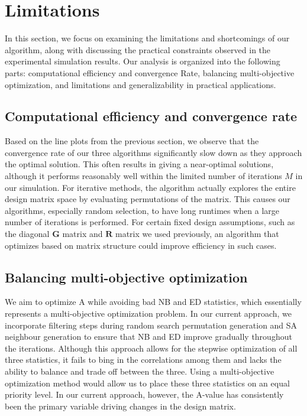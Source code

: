 \documentclass[
  a4paper,
  oneside,
  openany,
  12pt,
  onecolumn]{book}
\theoremstyle{definition}
\theoremstyle{plain}
\theoremstyle{remark}
\begin{document}
\section{Limitations}\label{limitations}

In this section, we focus on examining the limitations and shortcomings
of our algorithm, along with discussing the practical constraints
observed in the experimental simulation results. Our analysis is
organized into the following parts: computational efficiency and
convergence Rate, balancing multi-objective optimization, and
limitations and generalizability in practical applications.

\subsection{Computational efficiency and convergence
rate}\label{computational-efficiency-and-convergence-rate}

Based on the line plots from the previous section, we observe that the
convergence rate of our three algorithms significantly slow down as they
approach the optimal solution. This often results in giving a
near-optimal solutions, although it performs reasonably well within the
limited number of iterations \(M\) in our simulation. For iterative
methods, the algorithm actually explores the entire design matrix space
by evaluating permutations of the matrix. This causes our algorithms,
especially random selection, to have long runtimes when a large number
of iterations is performed. For certain fixed design assumptions, such
as the diagonal \(\boldsymbol{G}\) matrix and \(\boldsymbol{R}\) matrix
we used previously, an algorithm that optimizes based on matrix
structure could improve efficiency in such cases.

\subsection{Balancing multi-objective
optimization}\label{balancing-multi-objective-optimization}

We aim to optimize A while avoiding bad NB and ED statistics, which
essentially represents a multi-objective optimization problem. In our
current approach, we incorporate filtering steps during random search
permutation generation and SA neighbour generation to ensure that NB and
ED improve gradually throughout the iterations. Although this approach
allows for the stepwise optimization of all three statistics, it fails
to bing in the correlations among them and lacks the ability to balance
and trade off between the three. Using a multi-objective optimization
method would allow us to place these three statistics on an equal
priority level. In our current approach, however, the A-value has
consistently been the primary variable driving changes in the design
matrix.
\end{document}
